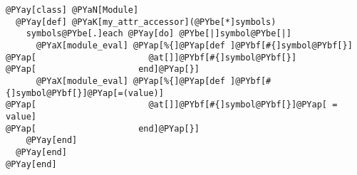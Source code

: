 \begin{Verbatim}[commandchars=@\[\]]
@PYay[class] @PYaN[Module]
  @PYay[def] @PYaK[my_attr_accessor](@PYbe[*]symbols)
    symbols@PYbe[.]each @PYay[do] @PYbe[|]symbol@PYbe[|]
      @PYaX[module_eval] @PYap[%{]@PYap[def ]@PYbf[#{]symbol@PYbf[}]
@PYap[                      @at[]]@PYbf[#{]symbol@PYbf[}]
@PYap[                    end]@PYap[}]
      @PYaX[module_eval] @PYap[%{]@PYap[def ]@PYbf[#{]symbol@PYbf[}]@PYap[=(value)]
@PYap[                      @at[]]@PYbf[#{]symbol@PYbf[}]@PYap[ = value]
@PYap[                    end]@PYap[}]
    @PYay[end]
  @PYay[end]
@PYay[end]
\end{Verbatim}
